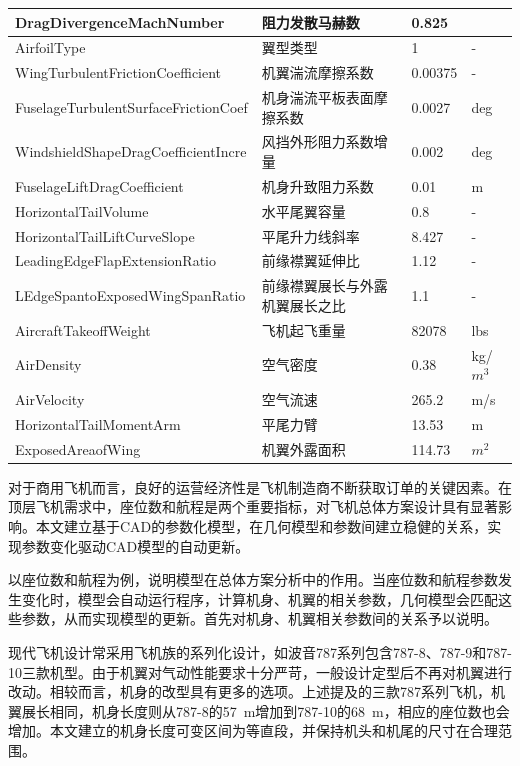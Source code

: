 \documentclass[12pt,a4paper]{report}
\begin{document}
\begin{center}
\begin{longtable}{|p{5.8cm}|p{3.9cm}|p{1.9cm}|p{1.4cm}|}
DragDivergenceMachNumber	&阻力发散马赫数  &	0.825&\-\\\hline
AirfoilType	&翼型类型    &1&-\\\hline
WingTurbulentFrictionCoefficient	&机翼湍流摩擦系数&0.00375&-\\\hline
FuselageTurbulentSurfaceFrictionCoef& 机身湍流平板表面摩擦系数	&	0.0027&deg\\\hline
WindshieldShapeDragCoefficientIncre&  风挡外形阻力系数增量		&	0.002&deg\\\hline
FuselageLiftDragCoefficient&	机身升致阻力系数  	&	0.01&m\\\hline
HorizontalTailVolume&  水平尾翼容量	&	0.8&-\\\hline
HorizontalTailLiftCurveSlope&  	平尾升力线斜率	&	8.427&-\\\hline
LeadingEdgeFlapExtensionRatio&前缘襟翼延伸比 	&	1.12&-\\\hline
LEdgeSpantoExposedWingSpanRatio&  前缘襟翼展长与外露机翼展长之比	&	1.1&-\\\hline
AircraftTakeoffWeight&飞机起飞重量  	&	82078&lbs\\\hline
AirDensity&空气密度  	&	0.38&kg/$m^3$\\\hline
AirVelocity&空气流速  	&	265.2&m/s\\\hline
HorizontalTailMomentArm&  平尾力臂	&	13.53&m\\\hline
ExposedAreaofWing&机翼外露面积  	&	114.73&$m^2$\\\hline
\hline
\end{longtable}
\end{center}

对于商用飞机而言，良好的运营经济性是飞机制造商不断获取订单的关键因素。在顶层飞机需求中，座位数和航程是两个重要指标，对飞机总体方案设计具有显著影响。本文建立基于CAD的参数化模型，在几何模型和参数间建立稳健的关系，实现参数变化驱动CAD模型的自动更新。

以座位数和航程为例，说明模型在总体方案分析中的作用。当座位数和航程参数发生变化时，模型会自动运行程序，计算机身、机翼的相关参数，几何模型会匹配这些参数，从而实现模型的更新。首先对机身、机翼相关参数间的关系予以说明。

现代飞机设计常采用飞机族的系列化设计，如波音787系列包含787-8、787-9和787-10三款机型。由于机翼对气动性能要求十分严苛，一般设计定型后不再对机翼进行改动。相较而言，机身的改型具有更多的选项。上述提及的三款787系列飞机，机翼展长相同，机身长度则从787-8的57\ m增加到787-10的68\ m，相应的座位数也会增加。本文建立的机身长度可变区间为等直段，并保持机头和机尾的尺寸在合理范围。
\end{document}
